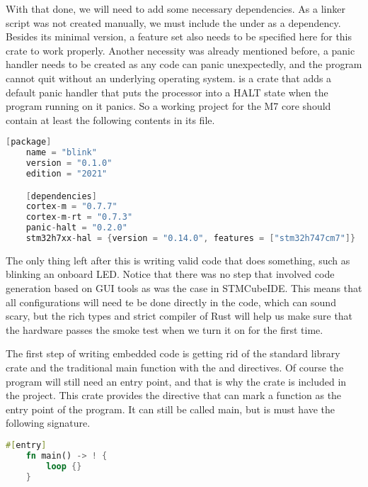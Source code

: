 With that done, we will need to add some necessary dependencies. As a  linker script was not created manually, we must include the  under as a dependency. Besides its minimal version, a feature set also needs to be specified here for this crate to work properly. Another necessity was already mentioned before, a panic handler needs to be created as any code can panic unexpectedly, and the program cannot quit without an underlying operating system.  is a crate that adds a default panic handler that puts the processor into a HALT state when the program running on it panics. So a working project for the M7 core should contain at least the following contents in its  file.

\begin{lstlisting}[language=C,frame=single,float=!ht,label={lst:cargo-toml},caption={Cargo.toml File of the Project}]
    [package]
    name = "blink"
    version = "0.1.0"
    edition = "2021"

    [dependencies]
    cortex-m = "0.7.7"
    cortex-m-rt = "0.7.3"
    panic-halt = "0.2.0"
    stm32h7xx-hal = {version = "0.14.0", features = ["stm32h747cm7"]}
\end{lstlisting}

The only thing left after this is writing valid code that does something, such as blinking an onboard LED. Notice that there was no step that involved code generation based on GUI tools as was the case in STMCubeIDE. This means that all configurations will need te be done directly in the code, which can sound scary, but the rich types and strict compiler of Rust will help us make sure that the hardware passes the smoke test when we turn it on for the first time.

The first step of writing embedded code is getting rid of the standard library crate and the traditional main function with the \mycode{#![no_std]} and \mycode{#![no_main]} directives. Of course the program will still need an entry point, and that is why the  crate is included in the project. This crate provides the \mycode{#[entry]} directive that can mark a function as the entry point of the program. It can still be called main, but is must have the following signature.

\begin{lstlisting}[language=Rust,frame=single,float=!ht,style=customrust,label={lst:embedded-main},caption={Main Function in Embedded Rust}]
    #[entry]
    fn main() -> ! {
        loop {}
    }
\end{lstlisting}

